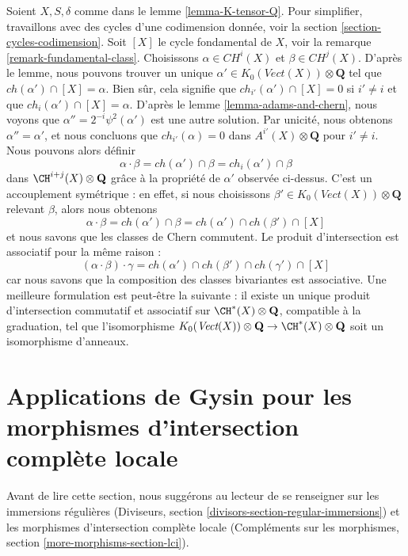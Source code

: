 \noindent
Soient $X, S, \delta$ comme dans le lemme \ref{lemma-K-tensor-Q}.
Pour simplifier, travaillons avec des cycles d'une codimension donnée, voir la
section \ref{section-cycles-codimension}.
Soit $[X]$ le cycle fondamental de $X$, voir la
remarque \ref{remark-fundamental-class}.
Choisissons $\alpha \in CH^i(X)$ et
$\beta \in CH^j(X)$. D'après le lemme, nous pouvons trouver un unique
$\alpha' \in K_0(\textit{Vect}(X)) \otimes \mathbf{Q}$ tel que
$ch(\alpha') \cap [X]  = \alpha$.
Bien sûr, cela signifie que $ch_{i'}(\alpha') \cap [X] = 0$
si $i' \not = i$ et que $ch_i(\alpha') \cap [X] = \alpha$.
D'après le lemme \ref{lemma-adams-and-chern}, nous voyons que
$\alpha'' = 2^{-i}\psi^2(\alpha')$ est une autre solution.
Par unicité, nous obtenons $\alpha'' = \alpha'$, et nous concluons
que $ch_{i'}(\alpha) = 0$ dans $A^{i'}(X) \otimes \mathbf{Q}$
pour $i' \not = i$. Nous pouvons alors définir
$$
\alpha \cdot \beta = ch(\alpha') \cap \beta =
ch_i(\alpha') \cap \beta
$$
dans $\CH^{i + j}(X) \otimes \mathbf{Q}$ grâce à la propriété de $\alpha'$
observée ci-dessus. C'est un accouplement symétrique : en effet, si nous choisissons
$\beta' \in K_0(\textit{Vect}(X)) \otimes \mathbf{Q}$ relevant
$\beta$, alors nous obtenons
$$
\alpha \cdot \beta = ch(\alpha') \cap \beta =
ch(\alpha') \cap ch(\beta') \cap [X]
$$
et nous savons que les classes de Chern commutent.
Le produit d'intersection est associatif pour la même raison :
$$
(\alpha \cdot \beta) \cdot \gamma =
ch(\alpha') \cap ch(\beta') \cap ch(\gamma') \cap [X]
$$
car nous savons que la composition des classes bivariantes est associative.
Une meilleure formulation est peut-être la suivante : il existe
un unique produit d'intersection commutatif et associatif sur
$\CH^*(X) \otimes \mathbf{Q}$, compatible à la graduation, tel que
l'isomorphisme
$K_0(\textit{Vect}(X)) \otimes \mathbf{Q} \to \CH^*(X) \otimes \mathbf{Q}$
soit un isomorphisme d'anneaux.






\section{Applications de Gysin pour les morphismes d'intersection complète locale}
\label{section-koszul}

\noindent
Avant de lire cette section, nous suggérons au lecteur de se renseigner sur les
immersions régulières
(Diviseurs, section \ref{divisors-section-regular-immersions}) et les
morphismes d'intersection complète locale
(Compléments sur les morphismes, section \ref{more-morphisms-section-lci}).

